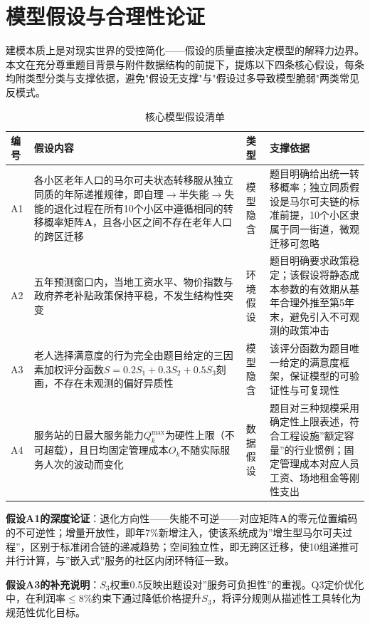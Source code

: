 
\section{模型假设与合理性论证}

建模本质上是对现实世界的受控简化——假设的质量直接决定模型的解释力边界。本文在充分尊重题目背景与附件数据结构的前提下，提炼以下四条核心假设，每条均附类型分类与支撑依据，避免"假设无支撑"与"假设过多导致模型脆弱"两类常见反模式。

\begin{table}[H]
\centering
\caption{核心模型假设清单}
\label{tab:assumptions}
\begin{tabular}{p{0.8cm}p{5.5cm}p{2.2cm}p{4.5cm}}
\toprule
\textbf{编号} & \textbf{假设内容} & \textbf{类型} & \textbf{支撑依据} \\
\midrule
A1 & 各小区老年人口的马尔可夫状态转移服从独立同质的年际递推规律，即自理$\to$半失能$\to$失能的退化过程在所有10个小区中遵循相同的转移概率矩阵$\mathbf{A}$，且各小区之间不存在老年人口的跨区迁移 & 模型隐含 & 题目明确给出统一转移概率；独立同质假设是马尔可夫链的标准前提，10个小区隶属于同一街道，微观迁移可忽略 \\
\midrule
A2 & 五年预测窗口内，当地工资水平、物价指数与政府养老补贴政策保持平稳，不发生结构性突变 & 环境假设 & 题目明确要求政策稳定；该假设将静态成本参数的有效期从基年合理外推至第5年末，避免引入不可观测的政策冲击 \\
\midrule
A3 & 老人选择满意度的行为完全由题目给定的三因素加权评分函数$S=0.2S_1+0.3S_2+0.5S_3$刻画，不存在未观测的偏好异质性 & 模型隐含 & 该评分函数为题目唯一给定的满意度框架，保证模型的可验证性与可复现性 \\
\midrule
A4 & 服务站的日最大服务能力$Q_k^{\max}$为硬性上限（不可超载），且日均固定管理成本$O_k$不随实际服务人次的波动而变化 & 数据假设 & 题目对三种规模采用确定性上限表述，符合工程设施”额定容量”的行业惯例；固定管理成本对应人员工资、场地租金等刚性支出 \\
\bottomrule
\end{tabular}
\end{table}

\textbf{假设A1的深度论证}：退化方向性——失能不可逆——对应矩阵$\mathbf{A}$的零元位置编码的不可逆性；增量开放性，即年7\%新增注入，使该系统成为”增生型马尔可夫过程”，区别于标准闭合链的递减趋势；空间独立性，即无跨区迁移，使10组递推可并行计算，与”嵌入式”服务的社区内闭环特征一致。

\textbf{假设A3的补充说明}：$S_3$权重0.5反映出题设对”服务可负担性”的重视。Q3定价优化中，在利润率$\le 8\%$约束下通过降低价格提升$S_3$，将评分规则从描述性工具转化为规范性优化目标。
